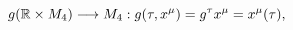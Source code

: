 \begin{equation}
g(\Bbb{R}\times M_{4}%
)\longrightarrow M_{4}:g(\tau ,x^{\mu })=g^{\tau }x^{\mu }=x^{\mu
}(\tau ),
\end{equation}

